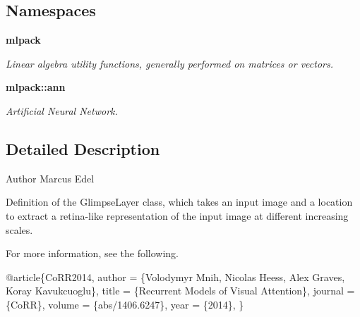 \subsection*{Namespaces}
\begin{DoxyCompactItemize}
\item 
 {\bf mlpack}
\begin{DoxyCompactList}\small\item\em Linear algebra utility functions, generally performed on matrices or vectors. \end{DoxyCompactList}\item 
 {\bf mlpack\+::ann}
\begin{DoxyCompactList}\small\item\em Artificial Neural Network. \end{DoxyCompactList}\end{DoxyCompactItemize}


\subsection{Detailed Description}
\begin{DoxyAuthor}{Author}
Marcus Edel
\end{DoxyAuthor}
Definition of the Glimpse\+Layer class, which takes an input image and a location to extract a retina-\/like representation of the input image at different increasing scales.

For more information, see the following.


\begin{DoxyCode}
@article\{CoRR2014,
  author  = \{Volodymyr Mnih, Nicolas Heess, Alex Graves, Koray Kavukcuoglu\},
  title   = \{Recurrent Models of Visual Attention\},
  journal = \{CoRR\},
  volume  = \{abs/1406.6247\},
  year    = \{2014\},
\}
\end{DoxyCode}
 